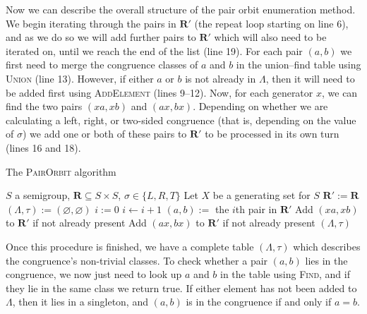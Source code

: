 Now we can describe the overall structure of the pair orbit enumeration method.
We begin iterating through the pairs in $\mathbf{R}'$ (the repeat loop starting on line 6), and as we do so we
will add further pairs to $\mathbf{R}'$ which will also need to be iterated on,
until we reach the end of the list (line 19).  For each pair $(a,b)$ we first need to
merge the congruence classes of $a$ and $b$ in the union--find table using
\textsc{Union} (line 13).  However, if either $a$ or $b$ is not
already in $\Lambda$, then it will need to be added first using \textsc{AddElement} (lines 9--12).  Now,
for each generator $x$, we can find the two pairs $(xa,xb)$ and $(ax,bx)$.
Depending on whether we are calculating a left, right, or two-sided congruence
(that is, depending on the value of $\sigma$)
we add one or both of these pairs to $\mathbf{R}'$ to be processed in its own
turn (lines 16 and 18).

\begin{algorithm}
\caption{The \textsc{PairOrbit} algorithm}
\label{alg:p}
\begin{algorithmic}[1]
\Require $S$ a semigroup,
         $\mathbf{R} \subseteq S \times S$,
         $\sigma \in \{L, R, T\}$
\State Let $X$ be a generating set for $S$
\State $\mathbf{R}' := \mathbf{R}$
\State $(\Lambda, \tau) := (\varnothing, \varnothing)$
\State $i := 0$  
\Repeat
  \State $i \gets i + 1$
  \State $(a,b) :=$ the $i$th pair in $\mathbf{R}'$
    \State {}
  \EndIf
    \State {}
  \EndIf
  \State {}
      \State Add $(xa, xb)$ to $\mathbf{R}'$ if not already present
    \EndIf
      \State Add $(ax, bx)$ to $\mathbf{R}'$ if not already present
    \EndIf
  \EndFor
{}  
\State \Return $(\Lambda, \tau)$
\EndProcedure
\end{algorithmic}
\end{algorithm}

Once this procedure is finished, we have a complete table $(\Lambda,\tau)$ which describes
the congruence's non-trivial classes.  To check whether a pair $(a,b)$ lies in
the congruence, we now just need to look up $a$ and $b$ in the table using
\textsc{Find}, and if they lie in the same class we return true.  If either
element has not been added to $\Lambda$, then it lies in a singleton, and $(a,b)$
is in the congruence if and only if $a=b$.

